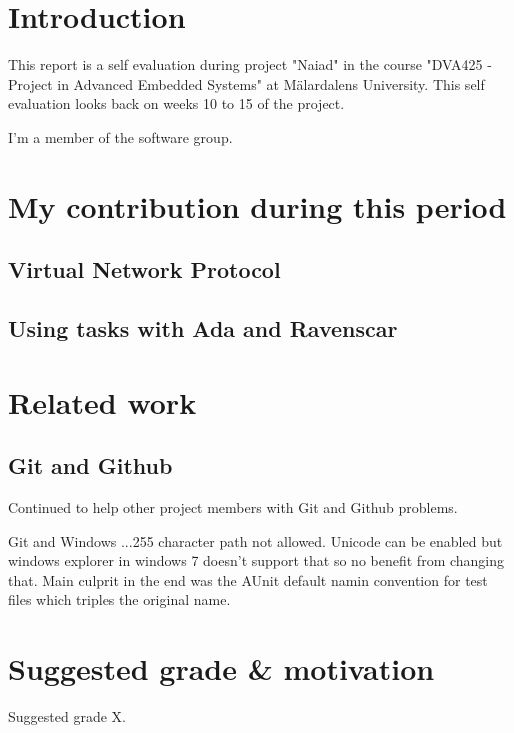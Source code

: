 \section{Introduction}
This report is a self evaluation during project "Naiad" in the course
"DVA425 - Project in Advanced Embedded Systems" at M\"{a}lardalens University.
This self evaluation looks back on weeks 10 to 15 of the project.

I'm a member of the software group.

\section{My contribution during this period}

\subsection{Virtual Network Protocol}

\subsection{Using tasks with Ada and Ravenscar}

\section{Related work}

\subsection{Git and Github}
Continued to help other project members with Git and Github problems.

Git and Windows ...255 character path not allowed. Unicode can be enabled but
windows explorer in windows 7 doesn't support that so no benefit from changing
that. Main culprit in the end was the AUnit default namin convention for test
files which triples the original name.

\section{Suggested grade \& motivation}
Suggested grade X.
